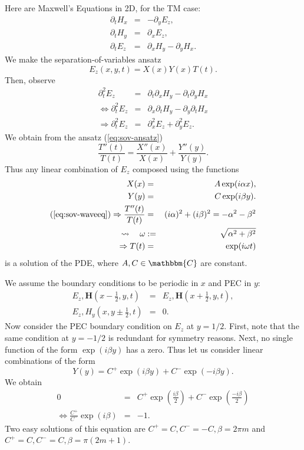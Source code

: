 \documentclass{article}
\newcommand{\assign}{:=}
\newcommand{\tmmathbf}[1]{\ensuremath{\boldsymbol{#1}}}
\begin{document}
Here are Maxwell's Equations in 2D, for the TM case:
\begin{eqnarray*}
  \partial_t H_x & = & - \partial_y E_z,\\
  \partial_t H_y & = & \partial_x E_z,\\
  \partial_t E_z & = & \partial_x H_y - \partial_y H_x .
\end{eqnarray*}
We make the separation-of-variables ansatz
\begin{equation}
  \label{eq:sov-ansatz} E_z (x, y, t) = X (x) Y (x) T (t) .
\end{equation}
Then, observe
\begin{eqnarray*}
  \partial_t^2 E_z & = & \partial_t \partial_x H_y - \partial_t \partial_y
  H_x\\
  \Leftrightarrow \partial_t^2 E_z & = & \partial_x \partial_t H_y -
  \partial_y \partial_t H_x\\
  \Rightarrow \partial_t^2 E_z & = & \partial_x^2 E_z + \partial_y^2 E_z .
\end{eqnarray*}
We obtain from the ansatz (\ref{eq:sov-ansatz})
\begin{equation}
  \label{eq:sov-waveeq} \frac{T'' (t)}{T (t)} = \frac{X'' (x)}{X (x)} +
  \frac{Y'' (y)}{Y (y)} .
\end{equation}
Thus any linear combination of $E_z$ composed using the functions
\begin{eqnarray*}
  X (x) & = & A \exp (i \alpha x),\\
  Y (y) & = & C \exp (i \beta y) .\\
  (\ref{eq:sov-waveeq}) \Rightarrow \frac{T'' (t)}{T (t)} & = & (i \alpha)^2 +
  (i \beta)^2 = - \alpha^2 - \beta^2\\
  \rightsquigarrow \quad \omega & \assign & \sqrt{\alpha^2 + \beta^2}\\
  \Rightarrow T (t) & = & \exp (i \omega t)
\end{eqnarray*}
is a solution of the PDE, where $A, C \in \mathbbm{C}$ are constant.

We assume the boundary conditions to be periodic in $x$ and PEC in $y$:
\begin{eqnarray*}
  E_z, \tmmathbf{H} \left( x - \frac{1}{2}, y, t \right) & = & E_z,
  \tmmathbf{H} \left( x + \frac{1}{2}, y, t \right),\\
  E_z, H_y \left( x, y \pm \frac{1}{2}, t \right) & = & 0.
\end{eqnarray*}
Now consider the PEC boundary condition on $E_z$ at $y = 1 / 2$. First, note
that the same condition at $y = - 1 / 2$ is redundant for symmetry reasons.
Next, no single function of the form $\exp (i \beta y)$ has a zero. Thus let
us consider linear combinations of the form
\[ Y (y) = C^+ \exp (i \beta y) + C^- \exp (- i \beta y) . \]
We obtain
\begin{eqnarray*}
  0 & = & C^+ \exp \left( \frac{i \beta}{2} \right) + C^- \exp \left( \frac{-
  i \beta}{2} \right)\\
  \Leftrightarrow \frac{C^+}{C^-} \exp (i \beta) & = & - 1.
\end{eqnarray*}
Two easy solutions of this equation are $C^+ = C, C^- = - C, \beta = 2 \pi m$
and $C^+ = C, C^- = C, \beta = \pi (2 m + 1)$.
\end{document}
